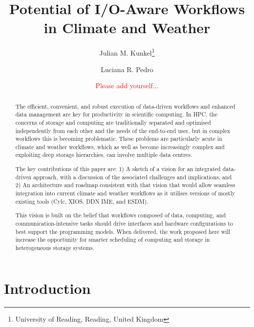 \documentclass{superfri}
\begin{document}
\author{Julian M. Kunkel\footnote{\label{uread}University of Reading, Reading, United Kingdom} \and Luciana R. Pedro \and \textcolor{red}{Please add yourself...}
}

\title{Potential of I/O-Aware Workflows in Climate and Weather}

\maketitle{}

\begin{abstract}
The efficient, convenient, and robust execution of data-driven workflows and enhanced data management are key for productivity in scientific computing. 
In HPC, the concerns of storage and computing are traditionally separated and optimised independently from each other and the needs of the end-to-end user, but in complex workflows this is becoming problematic. These problems are particularly acute in climate and weather workflows, which as well as become increasingly complex and exploiting deep storage hierarchies, can involve multiple data centres. 

The key contributions of this paper are:
1) A sketch of a vision for an integrated data-driven approach, with a discussion of the associated  challenges and implications, and 2) An architecture and roadmap consistent with that vision that would allow seamless integration into current climate and weather workflows as it utilises versions of mostly existing tools (Cylc, XIOS, DDN IME, and ESDM).

This vision is built on the belief that workflows composed of data, computing, and communication-intensive tasks should drive  interfaces and hardware configurations to best support the programming models. 
When delivered, the work proposed here will increase the opportunity for smarter scheduling of computing and storage in heterogeneous storage systems.

\end{abstract}


\section*{Introduction}
\label{sec:intro}
\end{document}
